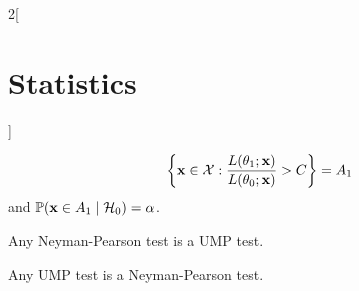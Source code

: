 \documentclass[../../../main.tex]{subfiles}
\begin{document}
\begin{multicols}{2}[\section{Statistics}]
\begin{definition}
\begin{gather*}
      \left\{\boldsymbol{\mathrm{x}}\in\mathcal{X}:\frac{L(\theta_1;\boldsymbol{\mathrm{x}})}{L(\theta_0;\boldsymbol{\mathrm{x}})}> C\right\}= A_1
    \end{gather*}
    and $\mathbb{P}(\boldsymbol{\mathrm{x}}\in A_1\mid \mathcal{H}_0)=\alpha$.
  \end{definition}
  \begin{lemma}
    Any Neyman-Pearson test is a UMP test.
  \end{lemma}
  \begin{theorem}
    Any UMP test is a Neyman-Pearson test.
  \end{theorem}
\end{multicols}
\end{document}
